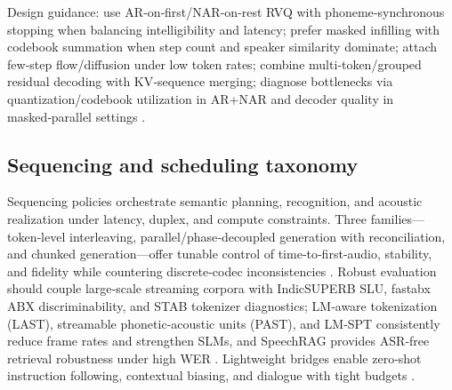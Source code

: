 Design guidance: use AR‑on‑first/NAR‑on‑rest RVQ with phoneme‑synchronous stopping when balancing intelligibility and latency; prefer masked infilling with codebook summation when step count and speaker similarity dominate; attach few‑step flow/diffusion under low token rates; combine multi‑token/grouped residual decoding with KV‑sequence merging; diagnose bottlenecks via quantization/codebook utilization in AR+NAR and decoder quality in masked‑parallel settings \cite{li2024masksrmaskedlanguagemodelfullbandspeechr,li2024investigatingneuralaudiocodecsspeechlang,wang2025tadicodectextawarediffusionspeechtokeniz}.

\subsection{Sequencing and scheduling taxonomy} \label{subsec:Sequencing and scheduling taxonomy}
Sequencing policies orchestrate semantic planning, recognition, and acoustic realization under latency, duplex, and compute constraints. Three families—token‑level interleaving, parallel/phase‑decoupled generation with reconciliation, and chunked generation—offer tunable control of time‑to‑first‑audio, stability, and fidelity while countering discrete‑codec inconsistencies \cite{liu2024analyzingmitigatinginconsistencydiscrete}. Robust evaluation should couple large‑scale streaming corpora with IndicSUPERB SLU, fastabx ABX discriminability, and STAB tokenizer diagnostics; LM‑aware tokenization (LAST), streamable phonetic‑acoustic units (PAST), and LM‑SPT consistently reduce frame rates and strengthen SLMs, and SpeechRAG provides ASR‑free retrieval robustness under high WER \cite{turetzky2024lastlanguagemodelawarespeechtokenization,har-tuv2025pastphoneticacousticspeechtokenizer,jo2025lmsptalignedsemanticdistillationspeechto,poli2025fastabxlibraryefficientcomputationabxdis,vashishth2024stabspeechtokenizerassessmentbenchmark,min2025speechretrievalaugmentedgenerationwithou,entry2025indicsuperbspeechprocessinguniversalperf}. Lightweight bridges enable zero‑shot instruction following, contextual biasing, and dialogue with tight budgets \cite{wang2023slmbridgethingapbetweenspeechtextfoundat}.

